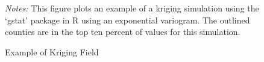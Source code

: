 \documentclass[11pt]{article}
\begin{document}
\begin{figure}[tbh!]
    \caption{Example of Kriging Field}
    \label{fig:kriging}
    \begin{center}
    \end{center}

    {\footnotesize
        \textit{Notes:} This figure plots an example of a kriging simulation using the `gstat' package in R using an exponential variogram. The outlined counties are in the top ten percent of values for this simulation. 
    }
\end{figure}
\end{document}
